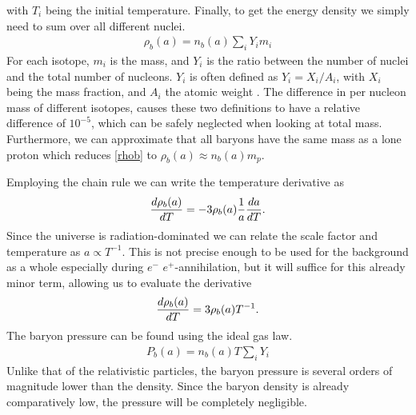 with $T_i$ being the initial temperature. Finally, to get the energy density we simply need to sum over all different nuclei. 
\begin{align}
    \rho_b(a)=n_b(a)\sum_{i}^{}Y_i m_i
    \label{rhob}
\end{align}
For each isotope, $m_i$ is the mass, and $Y_i$ is the ratio between the number of nuclei and the total number of nucleons. $Y_i$ is often defined as $Y_i=X_i/A_i$, with $X_i$ being the mass fraction, and $A_i$ the atomic weight \cite{Wagoner69}. The difference in per nucleon mass of different isotopes, causes these two definitions to have a relative difference of $10^{-5}$, which can be safely neglected when looking at total mass. Furthermore, we can approximate that all baryons have the same mass as a lone proton which reduces \eqref{rhob} to $\rho_b(a) \approx n_b(a)m_p$. 

Employing the chain rule we can write the temperature derivative as 
\begin{align}
    \frac{d\rho_b(a)}{dT} = -3\rho_b(a)\frac{1}{a}\frac{da}{dT}.
\end{align}
Since the universe is radiation-dominated we can relate the scale factor and temperature as $a\propto T^{-1}$. This is not precise enough to be used for the background as a whole especially during $e^-$ $e^+$-annihilation, but it will suffice for this already minor term, allowing us to evaluate the derivative
\begin{align}
    \frac{d\rho_b(a)}{dT} = 3\rho_b(a)T^{-1}.
    \label{drhob}
\end{align}
The baryon pressure can be found using the ideal gas law.
\begin{align}
    P_b(a)= n_b(a)T\sum_{i}^{}Y_i
\end{align}
Unlike that of the relativistic particles, the baryon pressure is several orders of magnitude lower than the density. Since the baryon density is already comparatively low, the pressure will be completely negligible.




